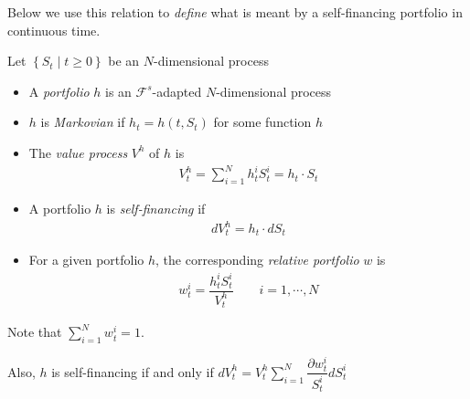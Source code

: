 \par\bigskip
\noindent Below we use this relation to \textit{define} what is meant by a self-financing portfolio in continuous time.
\par\bigskip
\begin{defo}[]{}
Let $\left\{S_t\mid t\geq0\right\}$ be an $N$-dimensional process\par
\begin{itemize}
  \item A \textit{portfolio} $h$ is an $\mathcal{F}^s$-adapted $N$-dimensional process
  \item $h$ is \textit{Markovian} if $h_t = h(t,S_t)$ for some function $h$
  \item The \textit{value process} $V^h$ of $h$ is
    \begin{equation*}
      \begin{gathered}
        V_t^h = \sum_{i=1}^{N}h_t^iS_t^i = h_t\cdot S_t
      \end{gathered}
    \end{equation*}
  \item A portfolio $h$ is \textit{self-financing} if
    \begin{equation*}
      \begin{gathered}
        dV_t^h = h_t\cdot dS_t
      \end{gathered}
    \end{equation*}
  \item For a given portfolio $h$, the corresponding \textit{relative portfolio} $w$ is
    \begin{equation*}
      \begin{gathered}
        w_t^i = \dfrac{h_t^iS_t^i}{V_t^h}\qquad i = 1,\cdots, N
      \end{gathered}
    \end{equation*}
\end{itemize}
\par\bigskip
\noindent Note that $\sum_{i=1}^{N}w_t^i = 1$.\par
\noindent Also, $h$ is self-financing if and only if $dV_t^h = V_t^h\sum_{i=1}^{N}\dfrac{\partial w_t^i}{S_t^i}dS_t^i$
\end{defo}
